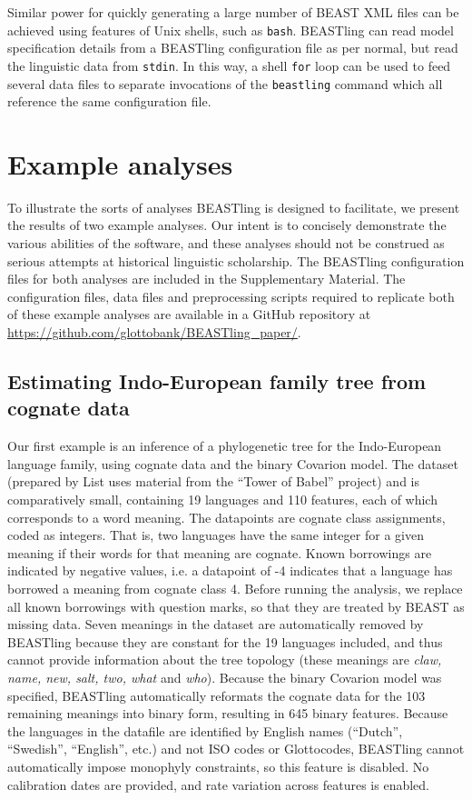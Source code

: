 \documentclass[twocolumn,10pt]{scrartcl}
\begin{document}
Similar power for quickly generating a large number of BEAST XML files can be achieved using features of Unix shells, such as \texttt{bash}.  BEASTling can read model specification details from a BEASTling configuration file as per normal, but read the linguistic data from \texttt{stdin}.  In this way, a shell \texttt{for} loop can be used to feed several data files to separate invocations of the \texttt{beastling} command which all reference the same configuration file.

\section{Example analyses}

To illustrate the sorts of analyses BEASTling is designed to facilitate, we present the results of two example analyses.  Our intent is to concisely demonstrate the various abilities of the software, and these analyses should not be construed as serious attempts at historical linguistic scholarship.  The BEASTling configuration files for both analyses are included in the Supplementary Material.  The configuration files, data files and preprocessing scripts required to replicate both of these example analyses are available in a GitHub repository at \url{https://github.com/glottobank/BEASTling_paper/}.

\subsection{Estimating Indo-European family tree from cognate data}

Our first example is an inference of a phylogenetic tree for the Indo-European language family, using cognate data and the binary Covarion model.  The dataset\cite{List2014a} (prepared by List\cite{List2014} uses material from the ``Tower of Babel'' project\cite{Starostin2008}) and is comparatively small, containing 19 languages and 110 features, each of which corresponds to a word meaning.  The datapoints are cognate class assignments, coded as integers.  That is, two languages have the same integer for a given meaning if their words for that meaning are cognate.  Known borrowings are indicated by negative values, i.e. a datapoint of -4 indicates that a language has borrowed a meaning from cognate class 4.  Before running the analysis, we replace all known borrowings with question marks, so that they are treated by BEAST as missing data.  Seven meanings in the dataset are automatically removed by BEASTling because they are constant for the 19 languages included, and thus cannot provide information about the tree topology (these meanings are \emph{claw, name, new, salt, two, what} and \emph{who}).  Because the binary Covarion model was specified, BEASTling automatically reformats the cognate data for the 103 remaining meanings into binary form, resulting in 645 binary features.  Because the languages in the datafile are identified by English names (``Dutch'', ``Swedish'', ``English'', etc.) and not ISO codes or Glottocodes, BEASTling cannot automatically impose monophyly constraints, so this feature is disabled.  No calibration dates are provided, and rate variation across features is enabled.
\end{document}
